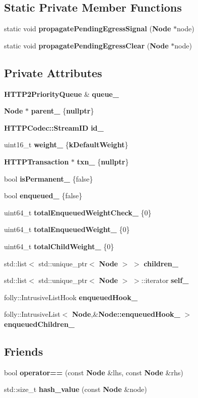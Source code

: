 \subsection*{Static Private Member Functions}
\begin{DoxyCompactItemize}
\item 
static void {\bf propagate\+Pending\+Egress\+Signal} ({\bf Node} $\ast$node)
\item 
static void {\bf propagate\+Pending\+Egress\+Clear} ({\bf Node} $\ast$node)
\end{DoxyCompactItemize}
\subsection*{Private Attributes}
\begin{DoxyCompactItemize}
\item 
{\bf H\+T\+T\+P2\+Priority\+Queue} \& {\bf queue\+\_\+}
\item 
{\bf Node} $\ast$ {\bf parent\+\_\+} \{{\bf nullptr}\}
\item 
{\bf H\+T\+T\+P\+Codec\+::\+Stream\+ID} {\bf id\+\_\+}
\item 
uint16\+\_\+t {\bf weight\+\_\+} \{{\bf k\+Default\+Weight}\}
\item 
{\bf H\+T\+T\+P\+Transaction} $\ast$ {\bf txn\+\_\+} \{{\bf nullptr}\}
\item 
bool {\bf is\+Permanent\+\_\+} \{false\}
\item 
bool {\bf enqueued\+\_\+} \{false\}
\item 
uint64\+\_\+t {\bf total\+Enqueued\+Weight\+Check\+\_\+} \{0\}
\item 
uint64\+\_\+t {\bf total\+Enqueued\+Weight\+\_\+} \{0\}
\item 
uint64\+\_\+t {\bf total\+Child\+Weight\+\_\+} \{0\}
\item 
std\+::list$<$ std\+::unique\+\_\+ptr$<$ {\bf Node} $>$ $>$ {\bf children\+\_\+}
\item 
std\+::list$<$ std\+::unique\+\_\+ptr$<$ {\bf Node} $>$ $>$\+::iterator {\bf self\+\_\+}
\item 
folly\+::\+Intrusive\+List\+Hook {\bf enqueued\+Hook\+\_\+}
\item 
folly\+::\+Intrusive\+List$<$ {\bf Node},\&{\bf Node\+::enqueued\+Hook\+\_\+} $>$ {\bf enqueued\+Children\+\_\+}
\end{DoxyCompactItemize}
\subsection*{Friends}
\begin{DoxyCompactItemize}
\item 
bool {\bf operator==} (const {\bf Node} \&lhs, const {\bf Node} \&rhs)
\item 
std\+::size\+\_\+t {\bf hash\+\_\+value} (const {\bf Node} \&node)
\end{DoxyCompactItemize}


